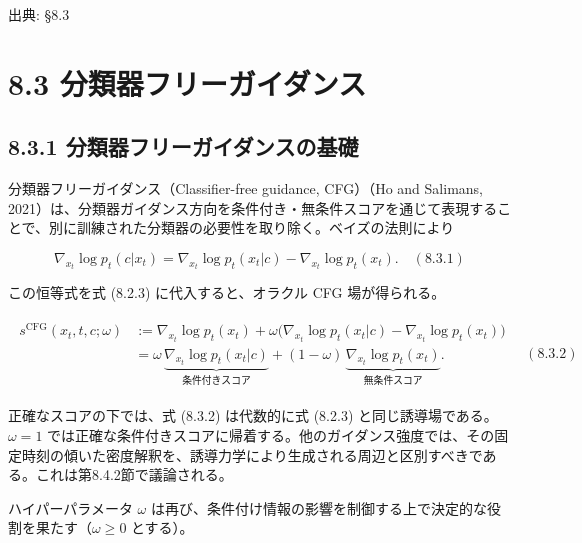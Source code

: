 

{\color{gray}\footnotesize 出典: §8.3\par}
\vspace{0.2em}

\section*{8.3 分類器フリーガイダンス}


\subsection*{8.3.1 分類器フリーガイダンスの基礎}




分類器フリーガイダンス（Classifier-free guidance, CFG）（Ho and Salimans, 2021）は、分類器ガイダンス方向を条件付き・無条件スコアを通じて表現することで、別に訓練された分類器の必要性を取り除く。ベイズの法則により

\[
\nabla_{x_t}\log p_t(c|x_t)
=
\nabla_{x_t}\log p_t(x_t|c)-\nabla_{x_t}\log p_t(x_t).
\quad (8.3.1)
\]


この恒等式を式 (8.2.3) に代入すると、オラクル CFG 場が得られる。

\begin{align*}
\begin{aligned}
s^{\mathrm{CFG}}(x_t,t,c;\omega)
&:=
\nabla_{x_t}\log p_t(x_t)+\omega\bigl(\nabla_{x_t}\log p_t(x_t|c)-\nabla_{x_t}\log p_t(x_t)\bigr)\\
&=
\omega\,\underbrace{\nabla_{x_t}\log p_t(x_t|c)}_{\text{条件付きスコア}}
+
(1-\omega)\,\underbrace{\nabla_{x_t}\log p_t(x_t)}_{\text{無条件スコア}}.
\end{aligned}
\quad (8.3.2)
\end{align*}


正確なスコアの下では、式 (8.3.2) は代数的に式 (8.2.3) と同じ誘導場である。$\omega=1$ では正確な条件付きスコアに帰着する。他のガイダンス強度では、その固定時刻の傾いた密度解釈を、誘導力学により生成される周辺と区別すべきである。これは第8.4.2節で議論される。

ハイパーパラメータ $\omega$ は再び、条件付け情報の影響を制御する上で決定的な役割を果たす（$\omega\ge 0$ とする）。


